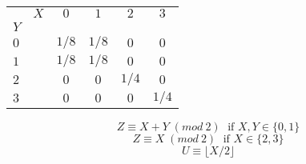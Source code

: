 
	\begin{center}
		\begin{tabular}{|l r||c|c|c|c|}
		    \hline 
		    		 &	$X$ & $0$ & $1$ & $2$ & $3$ \\ 
		    $Y$ &		  &		&			&			&		\\
		    \hline 
		    \hline
		    $0$ &		   & $1/8$ & $1/8$ & $0$ & $0$ \\ 
		    \hline 
		    $1$ &		   & $1/8$ & $1/8$ & $0$ & $0$ \\ 
		    \hline 
		    $2$ &		   & $0$ & $0$ & $1/4$ & $0$ \\ 
		    \hline 
		    $3$ &		   & $0$ & $0$ & $0$ & $1/4$ \\ 
		    \hline 
		  \end{tabular} 
	\end{center}		

		
	    $$Z \equiv X + Y\; (mod\: 2)\; \text{ if } X,Y \in \{ 0,1\}$$ 
	    $$Z \equiv X\; (mod\: 2)\; \text{ if } X \in \{ 2,3\}$$ 
	    $$U \equiv \lfloor X/2 \rfloor $$